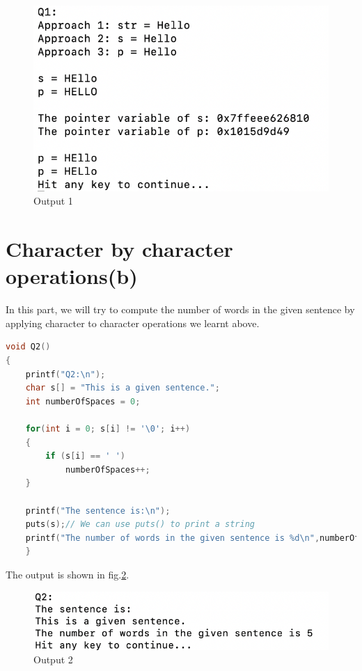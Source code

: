 \documentclass[12pt]{article}
\begin{document}
\begin{figure}[h]
\includegraphics[scale=0.85]{Images/output1.png} 
\caption{Output 1}
\label{output1}
\end{figure}


\section{Character by character operations(b)}
In this part, we will try to compute the number of words in the given sentence by applying character to character operations we learnt above.

\begin{lstlisting}[language=C, caption=Solution 2]
void Q2()
{
    printf("Q2:\n");
    char s[] = "This is a given sentence.";
    int numberOfSpaces = 0;
    
    for(int i = 0; s[i] != '\0'; i++)
    {
        if (s[i] == ' ')
            numberOfSpaces++;
    }
    
    printf("The sentence is:\n");
    puts(s);// We can use puts() to print a string
    printf("The number of words in the given sentence is %d\n",numberOfSpaces + 1);
    }
\end{lstlisting}
The output is shown in fig.\ref{output2}.
\begin{figure}[h]
\includegraphics[scale=0.85]{Images/output2.png} 
\caption{Output 2}
\label{output2}
\end{figure}
\end{document}
